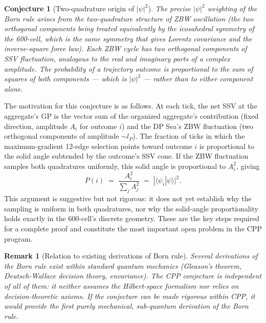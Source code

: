 \documentclass[12pt]{article}
\newtheorem{conjecture}[theorem]{Conjecture}
\newtheorem{remark}[theorem]{Remark}
\newcommand{\lP}{l_P}
\begin{document}
\begin{conjecture}[Two-quadrature origin of $|\psi|^2$]
\label{conj:born}
The precise $|\psi|^2$ weighting of the Born rule arises from the
two-quadrature structure of ZBW oscillation (the two orthogonal components
being treated equivalently by the icosahedral symmetry of the 600-cell,
which is the same symmetry that gives Lorentz covariance and the
inverse-square force law).  Each ZBW cycle has two orthogonal components of
SSV fluctuation, analogous to the real and imaginary parts of a complex
amplitude.  The probability of a trajectory outcome is proportional to the
sum of squares of both components --- which is $|\psi|^2$ --- rather than
to either component alone.
\end{conjecture}

The motivation for this conjecture is as follows.  At each tick, the net SSV
at the aggregate's GP is the vector sum of the organized aggregate's
contribution (fixed direction, amplitude $A_i$ for outcome $i$) and the DP
Sea's ZBW fluctuation (two orthogonal components of amplitude $\sim\lP$).
The fraction of ticks in which the maximum-gradient 12-edge selection points
toward outcome $i$ is proportional to the solid angle subtended by the
outcome's SSV cone.  If the ZBW fluctuation samples both quadratures
uniformly, this solid angle is proportional to $A_i^2$, giving
\begin{equation}
  P(i) \;=\; \frac{A_i^2}{\sum_j A_j^2}
  \;=\; |\langle\psi_i|\psi\rangle|^2.
  \label{eq:born}
\end{equation}
This argument is suggestive but not rigorous: it does not yet establish why
the sampling is uniform in both quadratures, nor why the solid-angle
proportionality holds exactly in the 600-cell's discrete geometry.  These
are the key steps required for a complete proof and constitute the most
important open problem in the CPP program.

\begin{remark}[Relation to existing derivations of Born rule]
Several derivations of the Born rule exist within standard quantum mechanics
(Gleason's theorem, Deutsch-Wallace decision theory, envariance).  The CPP
conjecture is independent of all of them: it neither assumes the Hilbert-space
formalism nor relies on decision-theoretic axioms.  If the conjecture can be
made rigorous within CPP, it would provide the first purely mechanical,
sub-quantum derivation of the Born rule.
\end{remark}

\end{document}
